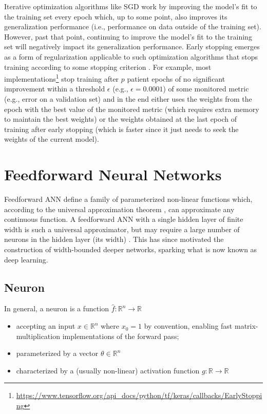 Iterative optimization algorithms like \ac{SGD} work by improving the model's fit to the training set every epoch which, up to some point, also improves its generalization performance (i.e., performance on data outside of the training set). However, past that point, continuing to improve the model's fit to the training set will negatively impact its generalization performance. Early stopping emerges as a form of regularization applicable to such optimization algorithms that stops training according to some stopping criterion \cite{earlystopping} \cite{deeplearning}. For example, most implementations\footnote{\url{https://www.tensorflow.org/api_docs/python/tf/keras/callbacks/EarlyStopping}} stop training after $p$ patient epochs of no significant improvement within a threshold $\epsilon$ (e.g., $\epsilon = 0.0001$) of some monitored metric (e.g., error on a validation set) and in the end either uses the weights from the epoch with the best value of the monitored metric (which requires extra memory to maintain the best weights) or the weights obtained at the last epoch of training after early stopping (which is faster since it just needs to seek the weights of the current model).

\section{Feedforward Neural Networks}

Feedforward \ac{ANN} define a family of parameterized non-linear functions which, according to the universal approximation theorem \cite{uat}, can approximate any continuous function. A feedforward \ac{ANN} with a single hidden layer of finite width is such a universal approximator, but may require a large number of neurons in the hidden layer (its width) \cite{uat}. This has since motivated the construction of width-bounded deeper networks, sparking what is now known as deep learning.

\subsection{Neuron}

In general, a neuron is a function $\hat{f} \colon \mathbb{R}^n \to \mathbb{R}$

\begin{itemize}
    \item accepting an input $x \in \mathbb{R}^{n}$ where $x_0 = 1$ by convention, enabling fast matrix-multiplication implementations of the forward pass;
    \item parameterized by a vector $\theta \in \mathbb{R}^{n}$
    \item characterized by a (usually non-linear) activation function $g \colon \mathbb{R} \to \mathbb{R}$
\end{itemize}

